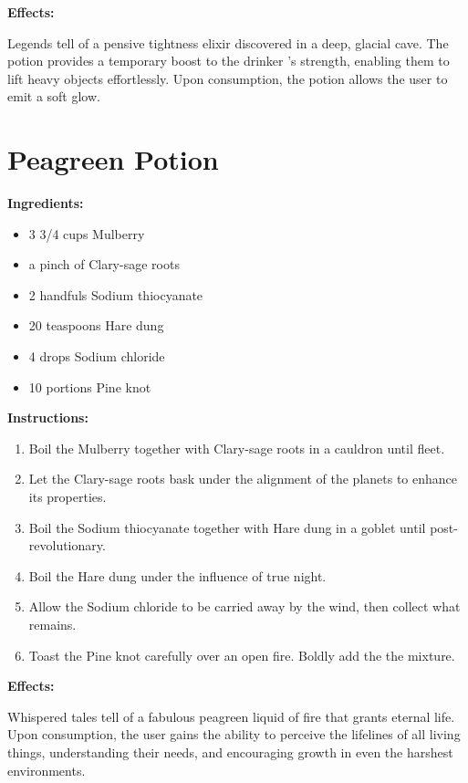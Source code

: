 \documentclass{article}
\begin{document}
\textbf{Effects:}

Legends tell of a pensive tightness elixir discovered in a deep, glacial cave. The potion provides a temporary boost to the drinker 's strength, enabling them to lift heavy objects effortlessly. Upon consumption, the potion allows the user to emit a soft glow.

\newpage
\section*{Peagreen Potion}

\textbf{Ingredients:}

\begin{itemize}
  \item 3 3/4 cups Mulberry
  \item a pinch of Clary-sage roots
  \item 2 handfuls Sodium thiocyanate
  \item 20 teaspoons Hare dung
  \item 4 drops Sodium chloride
  \item 10 portions Pine knot
\end{itemize}

\textbf{Instructions:}

\begin{enumerate}
  \item Boil the Mulberry together with Clary-sage roots in a cauldron until fleet.
  \item Let the Clary-sage roots bask under the alignment of the planets to enhance its properties.
  \item Boil the Sodium thiocyanate together with Hare dung in a goblet until post-revolutionary.
  \item Boil the Hare dung under the influence of true night.
  \item Allow the Sodium chloride to be carried away by the wind, then collect what remains.
  \item Toast the Pine knot carefully over an open fire. Boldly add the the mixture.
\end{enumerate}

\textbf{Effects:}

Whispered tales tell of a fabulous peagreen liquid of fire that grants eternal life. Upon consumption, the user gains the ability to perceive the lifelines of all living things, understanding their needs, and encouraging growth in even the harshest environments.
\end{document}
